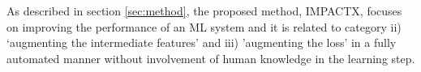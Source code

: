 As described in section \ref{sec:method}, the proposed method, IMPACTX, focuses on improving the performance of an ML system and it is related to category ii) ‘augmenting the intermediate features’ and iii) 'augmenting the loss' in a fully automated manner without involvement of human knowledge in the learning step. 





